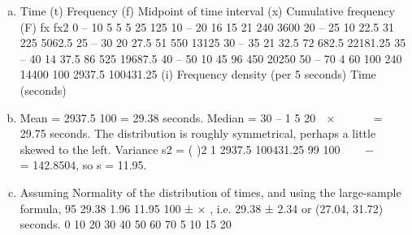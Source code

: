 \documentclass[a4paper,12pt]{article}
\begin{document}
\begin{enumerate}[(a)]
\item Time (t) Frequency (f) Midpoint of
time interval
(x)
Cumulative
frequency (F)
fx fx2
0 – 10 5 5 5 25 125
10 – 20 16 15 21 240 3600
20 – 25 10 22.5 31 225 5062.5
25 – 30 20 27.5 51 550 13125
30 – 35 21 32.5 72 682.5 22181.25
35 – 40 14 37.5 86 525 19687.5
40 – 50 10 45 96 450 20250
50 – 70 4 60 100 240 14400
100 2937.5 100431.25
(i) Frequency density (per 5 seconds)
Time (seconds)
\item  Mean = 2937.5
100
= 29.38 seconds. Median = 30 – 1 5
20
 ×   
 
= 29.75 seconds.
The distribution is roughly symmetrical, perhaps a little skewed to the left.
Variance s2 = ( )2 1 2937.5 100431.25
99 100
 
 − 
 
 
= 142.8504, so s = 11.95.
\item  Assuming Normality of the distribution of times, and using the large-sample
formula, 95%
29.38 1.96 11.95
100
± × , i.e. 29.38 ± 2.34 or (27.04, 31.72) seconds.
0 10 20 30 40 50 60 70
5
10
15
20
\end{enumerate}
\end{document}
